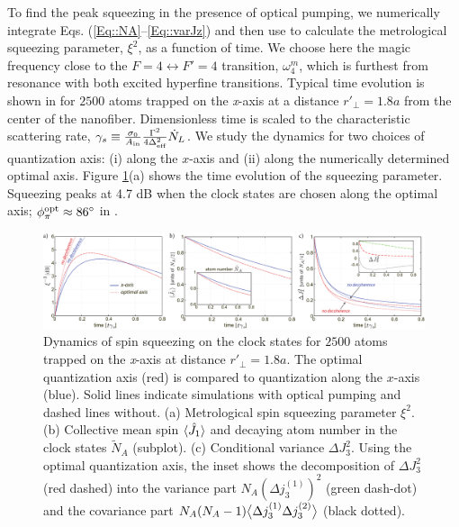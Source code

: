 \documentclass[preprint, aps,pra,onecolumn]{revtex4-1} %
\newcommand{\varz}{\Delta J_3^2}
\newcommand{\qangle}{\phi_\pi}
\newcommand{\magic}[1]{\omega_{#1}^m}
\newcommand{\NA}{\tilde{N}_A}
\begin{document}
To find the peak squeezing in the presence of optical pumping, we numerically integrate Eqs. (\ref{Eq::NA}--\ref{Eq::varJz}) and then use  to calculate the metrological squeezing parameter, $\xi^2$, as a function of time. 
We choose here the magic frequency close to the $ F=4\leftrightarrow F'=4 $ transition, $ \magic{4} $, which is furthest from resonance with both excited hyperfine transitions. 
Typical time evolution is shown in  for $2500$ atoms trapped on the \emph{x}-axis at a distance $r'\!_\perp=1.8a$ from the center of the nanofiber. 
Dimensionless time is scaled to the characteristic scattering rate, $\gamma_s \equiv %
\frac{\sigma_0}{A_{\rm in}}\frac{\Gamma^2}{4 \Delta_\eff^2} \dot{N}_L$. 
We study the dynamics for two choices of quantization axis: (i) along the $x$-axis and (ii) along the numerically determined optimal axis. 
Figure \ref{Fig::Squeezing_Dynamics}(a) shows the time evolution of the squeezing parameter. 
Squeezing peaks at 4.7 dB when the clock states are chosen along the optimal axis; $\qangle^{\rm opt} \approx 86^\circ$ in . 

\begin{figure}[t]
\includegraphics[scale=0.42]{./Figs/Fig_SqueezingDynamics}
\caption{Dynamics of spin squeezing on the clock states for $2500$ atoms trapped on the \emph{x}-axis at distance $ r'\!_\perp=1.8a$. 
The optimal quantization axis (red) is compared to quantization along the $x$-axis (blue). 
Solid lines indicate simulations with optical pumping and dashed lines without. 
(a) Metrological spin squeezing parameter $\xi^{2}$. 
(b) Collective mean spin $\langle{\hat{J}_1}\rangle$ and decaying atom number in the clock states $\NA$ (subplot).
(c) Conditional variance $\varz$. 
Using the optimal quantization axis, the inset shows the decomposition of $ \Delta J_3^2 $ (red dashed) into the variance part $N_A (\Delta j_3^{(1)})^2$ (green dash-dot) and the covariance part $N_A(N_A-1)\big\langle \Delta j_3^{(1)}\Delta j_3^{(2)} \big\rangle$ (black dotted).
}\label{Fig::Squeezing_Dynamics}
\end{figure}
\end{document}
